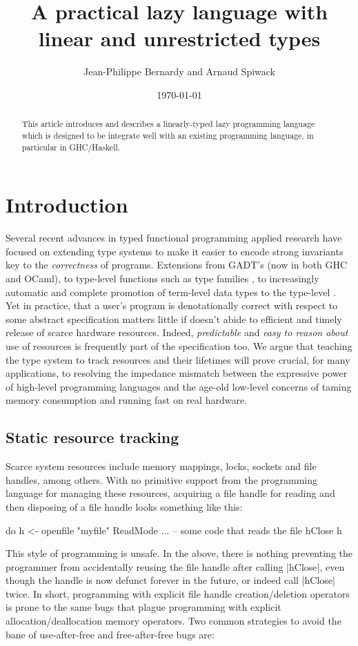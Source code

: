 \documentclass[11pt]{article}
\author{Jean-Philippe Bernardy and Arnaud Spiwack}
\date{\today}
\title{A practical lazy language with linear and unrestricted types}
\begin{document}
\maketitle
\begin{abstract}
  This article introduces and describes a
  linearly-typed lazy programming language which is designed to be
  integrate well with an existing programming language, in particular
  in GHC/Haskell.
\end{abstract}

\setcounter{tocdepth}{3}
\tableofcontents
\listoffigures

\section{Introduction}

Several recent advances in typed functional programming applied
research have focused on extending type systems to make it easier to
encode strong invariants key to the {\em correctness} of programs.
Extensions from GADT's \cite{xi_guarded_2003} (now in both GHC and
OCaml), to type-level functions such as type families
\cite{chakravarty_associated_2005-1}, to increasingly automatic and
complete promotion of term-level data types to the type-level
\cite{eisenburg_promoting_2014}. Yet in practice, that a user's
program is denotationally correct with respect to some abstract
specification matters little if doesn't abide to efficient and timely
release of scarce hardware resources. Indeed, {\em predictable} and
{\em easy to reason about} use of resources is frequently part of the
specification too. We argue that teaching the type system to track
resources and their lifetimes will prove crucial, for many
applications, to resolving the impedance mismatch between the
expressive power of high-level programming languages and the age-old
low-level concerns of taming memory consumption and running fast on
real hardware.

\subsection{Static resource tracking}

Scarce system resources include memory mappings, locks, sockets and
file handles, among others. With no primitive support from the
programming language for managing these resources, acquiring a file
handle for reading and then disposing of a file handle looks something
like this:
\begin{code}
do  h <- openfile "myfile" ReadMode
    ...     -- some code that reads the file
    hClose h
\end{code}
This style of programming is unsafe. In the above, there is nothing
preventing the programmer from accidentally reusing the file handle
after calling |hClose|, even though the handle is now defunct forever
in the future, or indeed call |hClose| twice. In short, programming
with explicit file handle creation/deletion operators is prone to the
same bugs that plague programming with explicit
allocation/deallocation memory operators. Two common strategies to
avoid the bane of use-after-free and free-after-free bugs are:
\end{document}
